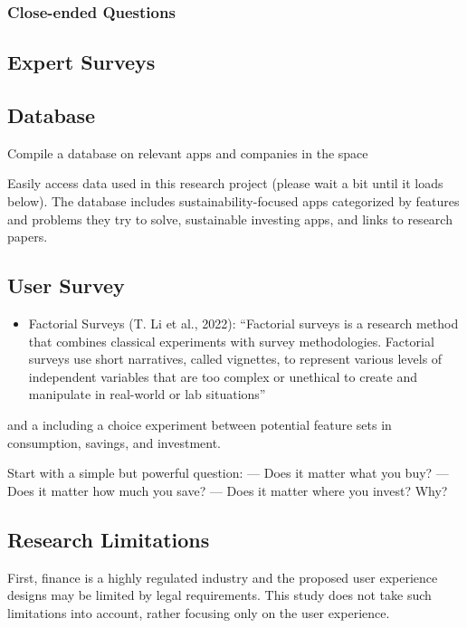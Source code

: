 \documentclass[
  letterpaper,
  DIV=11,
  numbers=noendperiod]{scrartcl}
\providecommand{\tightlist}{%
  \setlength{\itemsep}{0pt}\setlength{\parskip}{0pt}}\usepackage{longtable,booktabs,array}
\begin{document}
\subsubsection{Close-ended Questions}\label{close-ended-questions}

\subsection{Expert Surveys}\label{expert-surveys}

\subsection{Database}\label{database}

Compile a database on relevant apps and companies in the space

Easily access data used in this research project (please wait a bit
until it loads below). The database includes sustainability-focused apps
categorized by features and problems they try to solve, sustainable
investing apps, and links to research papers.

\subsection{User Survey}\label{user-survey}

\begin{itemize}
\tightlist
\item
  Factorial Surveys (T. Li et al., 2022): ``Factorial surveys is a
  research method that combines classical experiments with survey
  methodologies. Factorial surveys use short narratives, called
  vignettes, to represent various levels of independent variables that
  are too complex or unethical to create and manipulate in real-world or
  lab situations''
\end{itemize}

and a including a choice experiment between potential feature sets in
consumption, savings, and investment.

Start with a simple but powerful question: --- Does it matter what you
buy? --- Does it matter how much you save? --- Does it matter where you
invest? Why?

\subsection{Research Limitations}\label{research-limitations}

First, finance is a highly regulated industry and the proposed user
experience designs may be limited by legal requirements. This study does
not take such limitations into account, rather focusing only on the user
experience.
\end{document}
